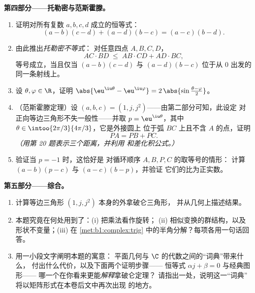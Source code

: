 \begin{problem}
\medskip
\noindent\textbf{第四部分——托勒密与范斯霍滕。}
\begin{enumerate}[resume]
  \item 证明对所有复数 $a, b, c, d$ 成立的恒等式：
        \[
        (a - b)(c - d) + (a - d)(b - c) = (a - c)(b - d) .
        \]
  \item 由此推出\emph{托勒密不等式}：
        对任意四点 $A, B, C, D$，
        \[
        AC \cdot BD \;\leq\; AB \cdot CD + AD \cdot BC ,
        \]
        等号成立，当且仅当 $(a-b)(c-d)$ 与
        $(a-d)(b-c)$ 位于从 $0$ 出发的同一条射线上。
  \item 设 $\theta, \varphi \in \R$，证明
        $\abs{\eu^{\iu\theta} - \eu^{\iu\varphi}} =
        2\,\abs{\sin\frac{\theta - \varphi}2}$。
  \item （范斯霍滕定理）设
        $(a, b, c) = (1, j, j^2)$——由第二部分可知，此设定
        对正向等边三角形不失一般性——并取
        $p = \eu^{\iu\theta}$，其中 $\theta \in
        \intoo{2\pi/3}{4\pi/3}$，它是外接圆上
        位于弧 $BC$ 上且不含 $A$ 的点，证明
        \[
        PA = PB + PC .
        \]
        \emph{（用第 20 题表示三个距离，并利用
        和差化积公式。）}
  \item 验证当 $p = -1$ 时，这恰好是
        对循环顺序 $A, B, P, C$ 的取等号的情形：
        计算 $(a - b)(p - c)$ 与 $(a - c)(b - p)$，并验证
        它们的比为正实数。
\end{enumerate}

\medskip
\noindent\textbf{第五部分——综合。}
\begin{enumerate}[resume]
  \item 计算等边三角形
        $(1, j, j^2)$ 本身的外拿破仑三角形，
        并从几何上描述结果。
  \item 本题究竟在何处用到了：(i) 把乘法看作旋转；
        (ii) 相似变换的群结构，以及
        形状不变量；(iii) 在
        \cref{met:b1:complex:trig} 中的半角分解？每项各用一句话回答。
  \item 用一小段文字阐明本题的寓意：
        平面几何与 $\C$ 的代数之间的“词典”带来什么，
        付出什么代价，以及下面两个证明步骤——
        恒等式 $\alpha j + \beta = 0$ 与经典图形——
        哪一个在你看来更能\emph{解释}拿破仑定理？
        请指出一处，说明这一“词典”
        将以矩阵形式在本卷后文中再次出现
        的地方。
\end{enumerate}
\end{problem}
